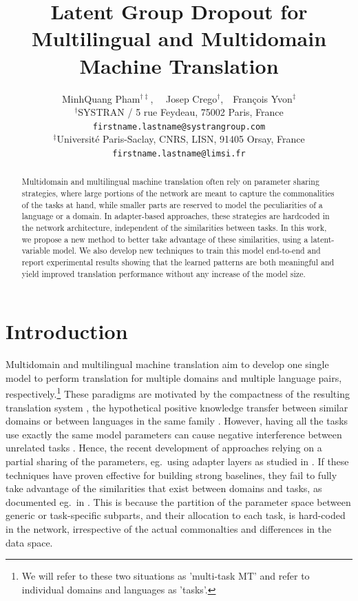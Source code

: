 \documentclass[11pt]{article}
\title{Latent Group Dropout for Multilingual and Multidomain Machine Translation}
\author{
  MinhQuang Pham$^{\dag\ddag}$, \ \ Josep Crego$^\dag$,\ \ Fran\c cois Yvon$^\ddag$ \\
  $^\dag$SYSTRAN / 5 rue Feydeau, 75002 Paris, France\\
  {\tt firstname.lastname@systrangroup.com}\\
  $^\ddag$Universit\'e Paris-Saclay, CNRS, LISN,  91405 Orsay, France\\
  {\tt firstname.lastname@limsi.fr}
}
\begin{document}
\setlength{\abovedisplayskip}{3pt}
\setlength{\belowdisplayskip}{3pt}
\maketitle

\begin{abstract}
  Multidomain and multilingual machine translation often rely on parameter sharing strategies, where large portions of the network are meant to capture the commonalities of the tasks at hand, while smaller parts are reserved to model the peculiarities of a language or a domain. In adapter-based approaches, these strategies are hardcoded in the network architecture, independent of the similarities between tasks. In this work, we propose a new method to better take advantage of these similarities, using a latent-variable model. We also develop new techniques to train this model end-to-end and report experimental results showing that the learned patterns are both meaningful and yield improved translation performance without any increase of the model size. 
\end{abstract}

\section{Introduction}
Multidomain and multilingual machine translation aim to develop one single model to perform translation for multiple domains and multiple language pairs, respectively.\footnote{We will refer to these two situations as 'multi-task MT' and refer to individual domains and languages as 'tasks'.} These paradigms are motivated by the compactness of the resulting translation system \citep{Chu18multilingual,dabre20survey}, the hypothetical positive knowledge transfer between similar domains \citep{Pham21revisiting} or between languages in the same family \citep{Tan19multilingual}. However, having all the tasks use exactly the same model parameters can cause negative interference between unrelated tasks \citep{conneau20unsupervised,wang20negative}. Hence, the recent development of approaches relying on a partial sharing of the parameters, eg.\ using adapter layers as studied in \citep{houlsby19parameter,Bapna19simple,Pham20Study,Philip20monolingual}. If these techniques have proven effective for building strong baselines, they fail to fully take advantage of the similarities that exist between domains and tasks, as documented eg.\ in \citep{Pham21revisiting}. This is because the partition of the parameter space between generic or task-specific subparts, and their allocation to each task, is hard-coded in the network, irrespective of the actual commonalties and differences in the data space.
\end{document}
